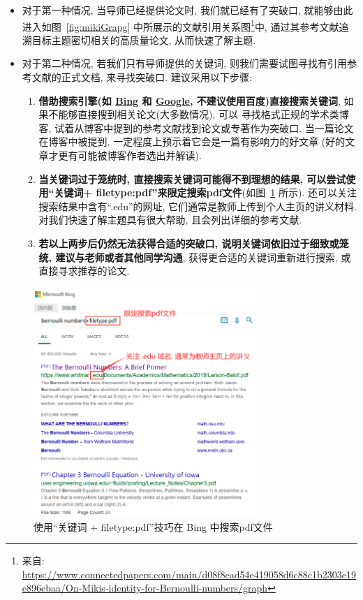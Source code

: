 \documentclass{formatBook}
\begin{document}
\begin{itemize}
    \item 对于第一种情况, 当导师已经提供论文时, 我们就已经有了突破口, 就能够由此进入如图~\ref{fig:mikiGrapg} 中所展示的文献引用关系图\footnote{来自: \url{https://www.connectedpapers.com/main/d08f8ead54e419058d6c88c1b2303e19e896ebaa/On-Mikis-identity-for-Bernoulli-numbers/graph}}中, 通过其参考文献追溯目标主题密切相关的高质量论文, 从而快速了解主题.
    \item 对于第二种情况, 若我们只有导师提供的关键词, 则我们需要试图寻找有引用参考文献的正式文档, 来寻找突破口. 建议采用以下步骤:
          \begin{enumerate}
              \item \textbf{借助搜索引擎(如 \href{https://www.bing.com/}{Bing} 和 \href{https://www.google.com/}{Google}, 不建议使用百度)直接搜索关键词}, 如果不能够直接搜到相关论文(大多数情况), 可以 寻找格式正规的学术类博客, 试着从博客中提到的参考文献找到论文或专著作为突破口. 当一篇论文在博客中被提到, 一定程度上预示着它会是一篇有影响力的好文章 (好的文章才更有可能被博客作者选出并解读).
              \item \textbf{当关键词过于笼统时, 直接搜索关键词可能得不到理想的结果, 可以尝试使用``关键词+ filetype:pdf''来限定搜索pdf文件}(如图~\ref{fig:bing} 所示). 还可以关注搜索结果中含有``.edu''的网址, 它们通常是教师上传到个人主页的讲义材料. 对我们快速了解主题具有很大帮助, 且会列出详细的参考文献.
              \item \textbf{若以上两步后仍然无法获得合适的突破口, 说明关键词依旧过于细致或笼统, 建议与老师或者其他同学沟通}, 获得更合适的关键词重新进行搜索, 或直接寻求推荐的论文.
          \end{enumerate}
\end{itemize}

\begin{figure}[H]
    \centering
    \includegraphics[width=0.75\textwidth]{figure/bingSearch.png}
    \caption{使用``关键词 + filetype:pdf''技巧在 Bing 中搜索pdf文件}
    \label{fig:bing}
\end{figure}
\end{document}

